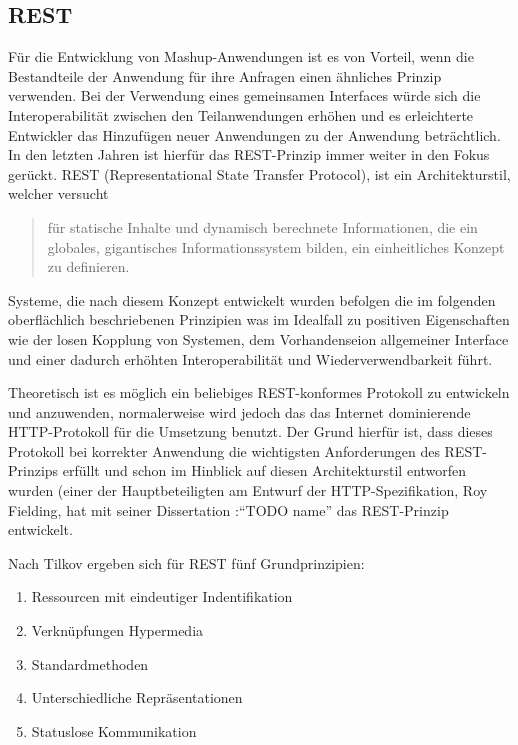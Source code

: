 \subsection{REST}\label{section:rest}
Für die Entwicklung von Mashup-Anwendungen ist es von Vorteil, wenn die Bestandteile der Anwendung für ihre Anfragen einen ähnliches Prinzip verwenden. Bei der Verwendung eines gemeinsamen Interfaces würde sich die Interoperabilität zwischen den Teilanwendungen erhöhen und es erleichterte Entwickler das Hinzufügen neuer Anwendungen zu der Anwendung beträchtlich. In den letzten Jahren ist hierfür das REST-Prinzip immer weiter in den Fokus  gerückt.
REST (Representational State Transfer Protocol), ist ein Architekturstil, welcher versucht 
\begin{quotation}
für statische Inhalte und dynamisch berechnete Informationen, die ein globales, gigantisches Informationssystem bilden, ein einheitliches Konzept zu definieren.
\end{quotation}
Systeme, die nach diesem Konzept entwickelt wurden befolgen die im folgenden oberflächlich beschriebenen Prinzipien was im Idealfall zu positiven Eigenschaften wie der losen Kopplung von Systemen, dem Vorhandenseion allgemeiner Interface und einer dadurch erhöhten Interoperabilität und Wiederverwendbarkeit führt.

Theoretisch ist es möglich ein beliebiges REST-konformes Protokoll zu entwickeln und anzuwenden, normalerweise wird jedoch das das Internet dominierende HTTP-Protokoll für die Umsetzung benutzt. Der Grund hierfür ist, dass dieses Protokoll bei korrekter Anwendung die wichtigsten Anforderungen des REST-Prinzips erfüllt und schon im Hinblick auf diesen Architekturstil entworfen wurden (einer der Hauptbeteiligten am Entwurf der HTTP-Spezifikation, Roy Fielding, hat mit seiner Dissertation :"`TODO name"' das REST-Prinzip entwickelt. 

Nach Tilkov ergeben sich für REST fünf Grundprinzipien:
\begin{enumerate}
 \item\label{enumerate_rest_principles:1} Ressourcen mit eindeutiger Indentifikation
 \item\label{enumerate_rest_principles:2} Verknüpfungen Hypermedia
 \item\label{enumerate_rest_principles:3} Standardmethoden
 \item\label{enumerate_rest_principles:4} Unterschiedliche Repräsentationen
 \item\label{enumerate_rest_principles:5} Statuslose Kommunikation
\end{enumerate}

